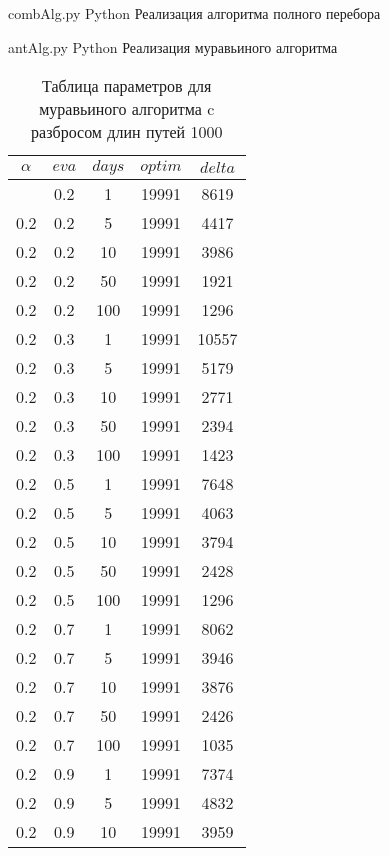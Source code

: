 \begin{appendices}
	\chapter{}
	{combAlg.py} 
	{Python} 
	{Реализация алгоритма полного перебора}
	
	{antAlg.py} 
	{Python}
	{Реализация муравьиного алгоритма}
	
	\begin{longtable}{|c|c|c|c|c|}
		\caption{Таблица параметров для муравьиного алгоритма c разбросом длин путей 1000}\label{t:params_1}\\
		\hline
		$\alpha$ & $eva$ & $days$ & $optim$ & $delta$ \\ \hline
		\endhead
		\endfoot
		0.2 & 0.2 & 1   & 19991 & 8619  \\
		0.2 & 0.2 & 5   & 19991 & 4417  \\
		0.2 & 0.2 & 10  & 19991 & 3986  \\
		0.2 & 0.2 & 50  & 19991 & 1921  \\
		0.2 & 0.2 & 100 & 19991 & 1296  \\ \hline
		0.2 & 0.3 & 1   & 19991 & 10557 \\
		0.2 & 0.3 & 5   & 19991 & 5179  \\
		0.2 & 0.3 & 10  & 19991 & 2771  \\
		0.2 & 0.3 & 50  & 19991 & 2394  \\
		0.2 & 0.3 & 100 & 19991 & 1423  \\ \hline
		0.2 & 0.5 & 1   & 19991 & 7648  \\
		0.2 & 0.5 & 5   & 19991 & 4063  \\
		0.2 & 0.5 & 10  & 19991 & 3794  \\
		0.2 & 0.5 & 50  & 19991 & 2428  \\
		0.2 & 0.5 & 100 & 19991 & 1296  \\ \hline
		0.2 & 0.7 & 1   & 19991 & 8062  \\
		0.2 & 0.7 & 5   & 19991 & 3946  \\
		0.2 & 0.7 & 10  & 19991 & 3876  \\
		0.2 & 0.7 & 50  & 19991 & 2426  \\
		0.2 & 0.7 & 100 & 19991 & 1035  \\ \hline
		0.2 & 0.9 & 1   & 19991 & 7374  \\
		0.2 & 0.9 & 5   & 19991 & 4832  \\
		0.2 & 0.9 & 10  & 19991 & 3959  \\

\end{longtable}
\end{appendices}
